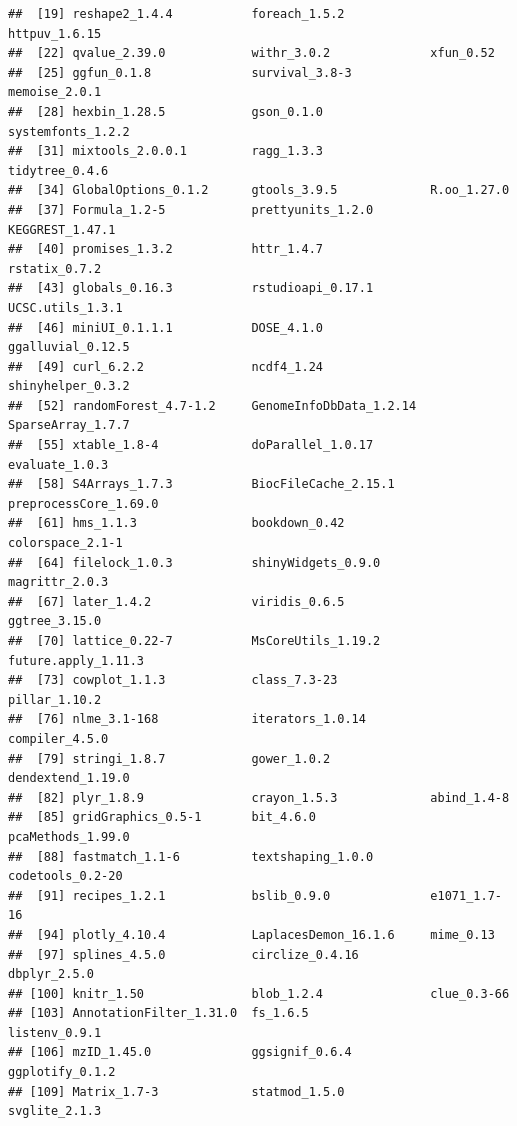 \documentclass[9pt,a4paper,]{extarticle}
\begin{document}
\begin{verbatim}
##  [19] reshape2_1.4.4           foreach_1.5.2            httpuv_1.6.15           
##  [22] qvalue_2.39.0            withr_3.0.2              xfun_0.52               
##  [25] ggfun_0.1.8              survival_3.8-3           memoise_2.0.1           
##  [28] hexbin_1.28.5            gson_0.1.0               systemfonts_1.2.2       
##  [31] mixtools_2.0.0.1         ragg_1.3.3               tidytree_0.4.6          
##  [34] GlobalOptions_0.1.2      gtools_3.9.5             R.oo_1.27.0             
##  [37] Formula_1.2-5            prettyunits_1.2.0        KEGGREST_1.47.1         
##  [40] promises_1.3.2           httr_1.4.7               rstatix_0.7.2           
##  [43] globals_0.16.3           rstudioapi_0.17.1        UCSC.utils_1.3.1        
##  [46] miniUI_0.1.1.1           DOSE_4.1.0               ggalluvial_0.12.5       
##  [49] curl_6.2.2               ncdf4_1.24               shinyhelper_0.3.2       
##  [52] randomForest_4.7-1.2     GenomeInfoDbData_1.2.14  SparseArray_1.7.7       
##  [55] xtable_1.8-4             doParallel_1.0.17        evaluate_1.0.3          
##  [58] S4Arrays_1.7.3           BiocFileCache_2.15.1     preprocessCore_1.69.0   
##  [61] hms_1.1.3                bookdown_0.42            colorspace_2.1-1        
##  [64] filelock_1.0.3           shinyWidgets_0.9.0       magrittr_2.0.3          
##  [67] later_1.4.2              viridis_0.6.5            ggtree_3.15.0           
##  [70] lattice_0.22-7           MsCoreUtils_1.19.2       future.apply_1.11.3     
##  [73] cowplot_1.1.3            class_7.3-23             pillar_1.10.2           
##  [76] nlme_3.1-168             iterators_1.0.14         compiler_4.5.0          
##  [79] stringi_1.8.7            gower_1.0.2              dendextend_1.19.0       
##  [82] plyr_1.8.9               crayon_1.5.3             abind_1.4-8             
##  [85] gridGraphics_0.5-1       bit_4.6.0                pcaMethods_1.99.0       
##  [88] fastmatch_1.1-6          textshaping_1.0.0        codetools_0.2-20        
##  [91] recipes_1.2.1            bslib_0.9.0              e1071_1.7-16            
##  [94] plotly_4.10.4            LaplacesDemon_16.1.6     mime_0.13               
##  [97] splines_4.5.0            circlize_0.4.16          dbplyr_2.5.0            
## [100] knitr_1.50               blob_1.2.4               clue_0.3-66             
## [103] AnnotationFilter_1.31.0  fs_1.6.5                 listenv_0.9.1           
## [106] mzID_1.45.0              ggsignif_0.6.4           ggplotify_0.1.2         
## [109] Matrix_1.7-3             statmod_1.5.0            svglite_2.1.3           

\end{verbatim}
\end{document}
